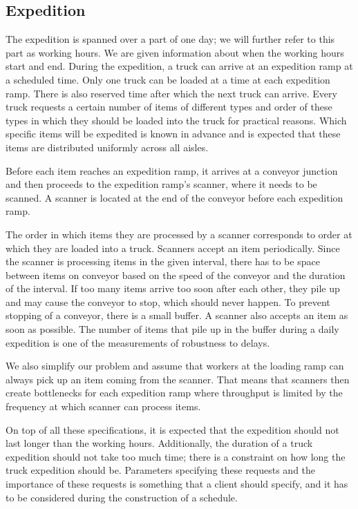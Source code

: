 \documentclass{ctuthesis}
\begin{document}
\subsection{Expedition}
\label{subsec:expedition}
The expedition is spanned over a part of one day; we will further refer to this part as working hours. We are given information about when the working hours start and end. During the expedition, a truck can arrive at an expedition ramp at a scheduled time. Only one truck can be loaded at a time at each expedition ramp. There is also reserved time after which the next truck can arrive. Every truck requests a certain number of items of different types and order of these types in which they should be loaded into the truck for practical reasons. Which specific items will be expedited is known in advance and is expected that these items are distributed uniformly across all aisles. 

Before each item reaches an expedition ramp, it arrives at a conveyor junction and then proceeds to the expedition ramp's scanner, where it needs to be scanned. A scanner is located at the end of the conveyor before each expedition ramp. 

The order in which items they are processed by a scanner corresponds to order at which they are loaded into a truck. Scanners accept an item periodically. Since the scanner is processing items in the given interval, there has to be space between items on conveyor based on the speed of the conveyor and the duration of the interval. If too many items arrive too soon after each other, they pile up and may cause the conveyor to stop, which should never happen. To prevent stopping of a conveyor, there is a small buffer. A scanner also accepts an item as soon as possible. The number of items that pile up in the buffer during a daily expedition is one of the measurements of robustness to delays.

We also simplify our problem and assume that workers at the loading ramp can always pick up an item coming from the scanner. That means that scanners then create bottlenecks for each expedition ramp where throughput is limited by the frequency at which scanner can process items.

On top of all these specifications, it is expected that the expedition should not last longer than the working hours. Additionally, the duration of a truck expedition should not take too much time; there is a constraint on how long the truck expedition should be. Parameters specifying these requests and the importance of these requests is something that a client should specify, and it has to be considered during the construction of a schedule.
\end{document}
